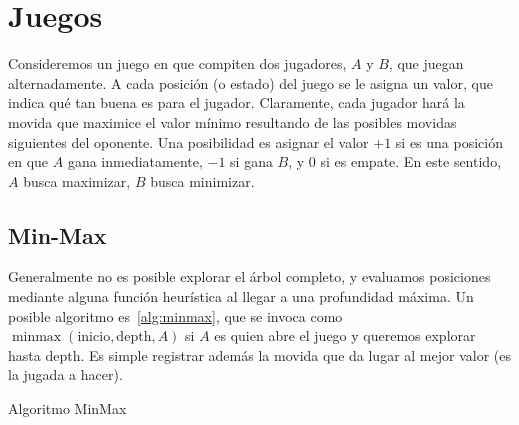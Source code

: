\section{Juegos}
\label{seq:juegos}

  Consideremos un juego en que compiten dos jugadores,
  \(A\) y \(B\),
  que juegan alternadamente.
  A cada posición
  (o estado)
  del juego se le asigna un valor,
  que indica qué tan buena es para el jugador.
  Claramente,
  cada jugador hará la movida
  que maximice el valor mínimo
  resultando de las posibles movidas siguientes del oponente.
  Una posibilidad es asignar el valor \(+1\)
  si es una posición en que \(A\) gana inmediatamente,
  \(-1\) si gana \(B\),
  y \num{0} si es empate.
  En este sentido,
  \(A\) busca maximizar,
  \(B\) busca minimizar.

\subsection{Min-Max}
\label{seq:minmax}

  Generalmente no es posible explorar el árbol completo,
  y evaluamos posiciones mediante alguna función heurística
  al llegar a una profundidad máxima.
  Un posible algoritmo es~\ref{alg:minmax},
  que se invoca
  como \(\operatorname{minmax}(\mathrm{inicio},
                               \mathrm{depth}, A)\)
  si \(A\) es quien abre el juego
  y queremos explorar hasta \(\mathrm{depth}\).
  Es simple registrar además la movida que da lugar al mejor valor
  (es la jugada a hacer).
  \begin{algorithm}
    \DontPrintSemicolon\Indp

    \caption{Algoritmo MinMax}
    \label{alg:minmax}
  \end{algorithm}

